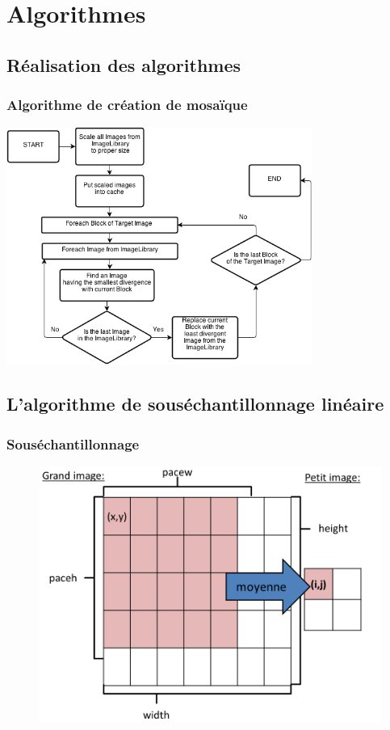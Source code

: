 \documentclass[handout]{beamer}
\begin{document}
\section{Algorithmes}

\subsection{R\'ealisation des algorithmes}
\begin{frame}

\frametitle{\bf Algorithme de cr\'eation de mosa\"ique}
\begin{centering}
\includegraphics[width=0.75\textwidth]{the_mosaic_creation_algorithm.png}
\end{centering}
\end{frame}

\subsection{L'algorithme de sous\'echantillonnage lin\'eaire}
\begin{frame}
\frametitle{\bf Sous\'echantillonnage}
\begin{figure}[H]
\includegraphics[scale=0.36]{scale_to.png}
\end{figure}
\end{frame}
\end{document}
